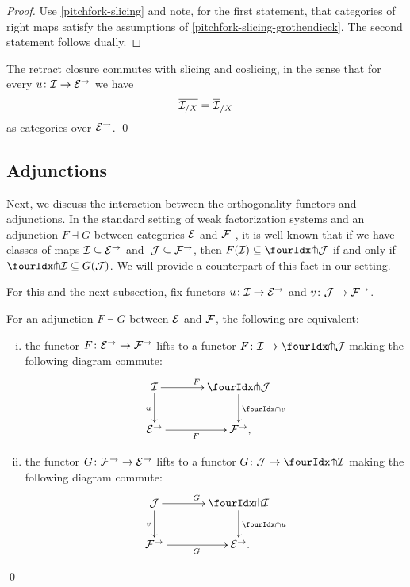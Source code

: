 \documentclass[reqno,10pt,a4paper,oneside,draft]{amsart}
\begin{document}
\begin{proof}
Use \cref{pitchfork-slicing} and note, for the first statement, that categories of right maps satisfy the assumptions of \cref{pitchfork-slicing-grothendieck}. The second statement
follows dually.
\end{proof}

\begin{proposition}
The retract closure commutes with slicing and coslicing, in the sense that for every $u \co \cal{I} \to \catE^\to$ we have
\[
  \overline{\cal{I}_{/X}} = \overline{\cal{I}}_{/X}
\]
as categories over $\catE^\to$.
\qed
\end{proposition}

\subsection*{Adjunctions}

Next, we discuss the interaction between the orthogonality functors and adjunctions.
In the standard setting of weak factorization systems and an adjunction $F \dashv G$ between categories $\cal{E}$ and $\cal{F}$ , it is well known that if we have classes of maps $\cal{I} \subseteq \catE^\to$ and~$\cal{J} \subseteq \cal{F}^\to$, then $F(\cal{I}) \subseteq \liftl{\cal{J}}$ if and only if $\liftr{\cal{I}} \subseteq G(\cal{J})$.
We will provide a counterpart of this fact in our setting.

For this and the next subsection, fix functors $u \co \cal{I} \to \catE^\to$ and $v \co \cal{J} \to \cal{F}^\to$.

\begin{proposition} \label{lift-of-adjunction}
For an adjunction $F \dashv G$ between $\cal{E}$ and $\cal{F}$, the following are equivalent:
\begin{enumerate}[(i)]
\item the functor $F \co \catE^\to \to \cal{F}^\to$ lifts to a functor $F \co \cal{I} \to \liftl{\cal{J}}$ making the following diagram commute:
\[
\xymatrix@C=1.2cm{
  \cal{I}
  \ar[r]^{F}
  \ar[d]_{u}
&
  \liftl{\cal{J}}
  \ar[d]^{\liftl{v}}
\\
  \catE^\to
  \ar[r]_-{F}
&
  \cal{F}^\to
\rlap{,}}
\]
\item the functor $G \co \cal{F}^\to \to \catE^\to$ lifts to a functor $G \co \cal{J} \to \liftr{\cal{I}}$ making the following diagram commute:
\[
\xymatrix@C=1.2cm{
  \cal{J}
    \ar[d]_{v}
\ar[r]^{G}
&
  \liftr{\cal{I}}
  \ar[d]^{\liftr{u}}
\\
  \cal{F}^\to
   \ar[r]_{G}
&
  \catE^\to
\rlap{.}  } 
\]
\end{enumerate}
\qed
\end{proposition}
\end{document}

